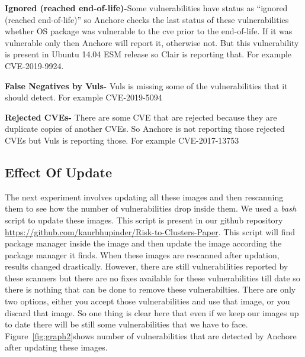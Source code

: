 \documentclass[a4paper,num-refs]{oup-contemporary}
\begin{document}
\textbf{Ignored (reached end-of-life)-}Some vulnerabilities have status as “ignored (reached end-of-life)” 
		so Anchore checks the last status of these vulnerabilities whether OS package was vulnerable to the cve 
		prior to the end-of-life. If it was vulnerable only then Anchore will report it, otherwise not. But this 
		vulnerability is present in Ubuntu 14.04 ESM release so Clair is reporting that. For example CVE-2019-9924.

\textbf{False Negatives by Vuls-} Vuls is missing some of the vulnerabilities that it should detect. 
		For example CVE-2019-5094

\textbf{Rejected CVEs-} There are some CVE that are rejected because they are duplicate copies of another CVEs. 
	So Anchore is not reporting those rejected CVEs but Vuls is reporting those. For example CVE-2017-13753

\subsection{Effect Of Update}

The next experiment involves updating all these images and then rescanning them to see how the number of
vulnerabilities drop inside them. We used a \textit{bash} script to update these images. This script is
present in our github repository \href{https://github.com/kaurbhupinder/Risk-to-Clusters-Paper}
{https://github.com/kaurbhupinder/Risk-to-Clusters-Paper}. This script 
will find package manager inside the image and then update the image according the package manager it finds.
When these images are rescanned after updation, results changed drastically. However, there are still
vulnerabilities reported by these scanners but there are no fixes available for these vulnerabilities
till date so there is nothing that can be done to remove these vulnerabilties. There are only two
options, either you accept those vulnerabilities and use that image, or you discard that image.
So one thing is clear here that even if we keep our images up to date there will be still some
vulnerabilities that we have to face.
Figure~\ref{fig:graph2}shows number of vulnerabilities that are detected by Anchore after updating these images.
\end{document}
